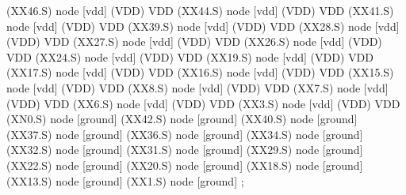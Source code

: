\begin{circuitikz}[american]

	(XX46.S) node [vdd] (VDD) {VDD}
	(XX44.S) node [vdd] (VDD) {VDD}
	(XX41.S) node [vdd] (VDD) {VDD}
	(XX39.S) node [vdd] (VDD) {VDD}
	(XX28.S) node [vdd] (VDD) {VDD}
	(XX27.S) node [vdd] (VDD) {VDD}
	(XX26.S) node [vdd] (VDD) {VDD}
	(XX24.S) node [vdd] (VDD) {VDD}
	(XX19.S) node [vdd] (VDD) {VDD}
	(XX17.S) node [vdd] (VDD) {VDD}
	(XX16.S) node [vdd] (VDD) {VDD}
	(XX15.S) node [vdd] (VDD) {VDD}
	(XX8.S) node [vdd] (VDD) {VDD}
	(XX7.S) node [vdd] (VDD) {VDD}
	(XX6.S) node [vdd] (VDD) {VDD}
	(XX3.S) node [vdd] (VDD) {VDD}
	(XN0.S) node [ground] {}
	(XX42.S) node [ground] {}
	(XX40.S) node [ground] {}
	(XX37.S) node [ground] {}
	(XX36.S) node [ground] {}
	(XX34.S) node [ground] {}
	(XX32.S) node [ground] {}
	(XX31.S) node [ground] {}
	(XX29.S) node [ground] {}
	(XX22.S) node [ground] {}
	(XX20.S) node [ground] {}
	(XX18.S) node [ground] {}
	(XX13.S) node [ground] {}
	(XX1.S) node [ground] {}
;

\end{circuitikz}
